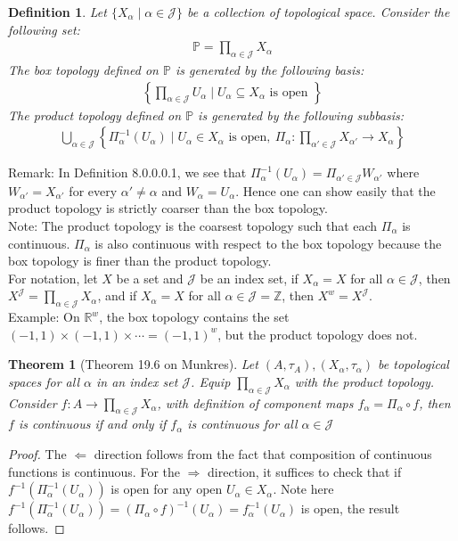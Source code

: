 \documentclass[11pt]{book}
\theoremstyle{break}
\theoremstyle{break}
\newtheorem{thm}{Theorem}[section]
\newtheorem{defn}{Definition}[corL]
\newcommand{\R}{\mathbb{R}}
\newcommand{\Z}{\mathbb{Z}}
\newcommand{\note}{\color{red}Note: \color{black}}
\newcommand{\remark}{\color{blue}Remark: \color{black}}
\newcommand{\example}{\color{green}Example: \color{black}}
\begin{document}
\begin{defn}
Let $\{X_\alpha\mid \alpha \in \mathcal{J}\}$ be a collection of topological space. Consider the following set:
\begin{align*}
\mathbb{P} = \prod_{\alpha \in \mathcal{J}}X_\alpha
\end{align*}
The box topology defined on $\mathbb{P}$ is generated by the following basis:
\begin{align*}
\left\{\prod_{\alpha \in \mathcal{J}}U_\alpha \mid U_\alpha \subseteq X_{\alpha} \text{ is open }\right\}
\end{align*}
The product topology defined on $\mathbb{P}$ is generated by the following subbasis:
\begin{align*}
\bigcup_{\alpha \in \mathcal{J}}\left\{\Pi_\alpha^{-1}(U_\alpha) \mid U_\alpha \in X_\alpha \text{ is open},\ \Pi_\alpha : \prod_{\alpha'\in \mathcal{J}}X_{\alpha'} \to X_\alpha\right\}
\end{align*}
\end{defn}
\remark In Definition 8.0.0.0.1, we see that $\Pi_{\alpha}^{-1}(U_\alpha) = \Pi_{\alpha' \in \mathcal{J}}W_{\alpha'}$ where $W_{\alpha'} = X_{\alpha'}$ for every $\alpha' \neq \alpha$ and $W_\alpha = U_\alpha$. Hence one can show easily that the product topology is strictly coarser than the box topology.\\

\note The product topology is the coarsest topology such that each $\Pi_\alpha$ is continuous. $\Pi_\alpha$ is also continuous with respect to the box topology because the box topology is finer than the product topology.\\


For notation, let $X$ be a set and $\mathcal{J}$ be an index set, if $X_\alpha = X$ for all $\alpha \in \mathcal{J}$, then $X^\mathcal{J} = \prod_{\alpha \in \mathcal{J}}X_\alpha$, and if $X_\alpha = X$ for all $\alpha \in \mathcal{J} = \Z$, then $X^w = X^{\mathcal{J}}$. \\

\example On $\R^w$, the box topology contains the set $(-1,1) \times (-1,1)\times \cdots  = (-1,1)^w$, but the product topology does not. 

\begin{thm}[Theorem 19.6 on Munkres]
Let $(A,\tau_A),(X_\alpha,\tau_\alpha)$ be topological spaces for all $\alpha $ in an index set $\mathcal{J}$. Equip $\prod_{\alpha \in \mathcal{J}}X_\alpha$ with the product topology. Consider $f:A \to \prod_{\alpha\in \mathcal{J}}X_\alpha$, with definition of component maps $f_\alpha = \Pi_{\alpha }\circ f$, then $f$ is continuous if and only if $f_\alpha$ is continuous for all $\alpha \in \mathcal{J}$
\end{thm}
\begin{proof}
The $\Leftarrow$ direction follows from the fact that composition of continuous functions is continuous. For the $\Rightarrow$ direction, it suffices to check that if $f^{-1}(\Pi_{\alpha}^{-1}(U_\alpha))$ is open for any open $U_\alpha \in X_{\alpha}$. Note here $f^{-1}(\Pi_{\alpha}^{-1}(U_\alpha)) = (\Pi_\alpha \circ f)^{-1}(U_\alpha) = f_\alpha^{-1}(U_\alpha)$ is open, the result follows. 
\end{proof}
\end{document}
